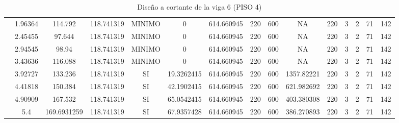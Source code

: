 \begin{table}[H]
{\begin{tabular}{|c|c|c|c|c|c|c|c|c|c|c|c|c|c|c|}
\cline{2-15}    & 1.96364 & 114.792 & 118.741319 & MINIMO & 0   & 614.660945 & 220 & 600 & NA  & 220 & 3   & 2   & 71  & 142 \bigstrut\\
\cline{2-15}    & 2.45455 & 97.644 & 118.741319 & MINIMO & 0   & 614.660945 & 220 & 600 & NA  & 220 & 3   & 2   & 71  & 142 \bigstrut\\
\cline{2-15}    & 2.94545 & 98.94 & 118.741319 & MINIMO & 0   & 614.660945 & 220 & 600 & NA  & 220 & 3   & 2   & 71  & 142 \bigstrut\\
\cline{2-15}    & 3.43636 & 116.088 & 118.741319 & MINIMO & 0   & 614.660945 & 220 & 600 & NA  & 220 & 3   & 2   & 71  & 142 \bigstrut\\
\cline{2-15}    & 3.92727 & 133.236 & 118.741319 & SI  & 19.3262415 & 614.660945 & 220 & 600 & 1357.82221 & 220 & 3   & 2   & 71  & 142 \bigstrut\\
\cline{2-15}    & 4.41818 & 150.384 & 118.741319 & SI  & 42.1902415 & 614.660945 & 220 & 600 & 621.982692 & 220 & 3   & 2   & 71  & 142 \bigstrut\\
\cline{2-15}    & 4.90909 & 167.532 & 118.741319 & SI  & 65.0542415 & 614.660945 & 220 & 600 & 403.380308 & 220 & 3   & 2   & 71  & 142 \bigstrut\\
\cline{2-15}    & 5.4 & 169.6931259 & 118.741319 & SI  & 67.9357428 & 614.660945 & 220 & 600 & 386.270893 & 220 & 3   & 2   & 71  & 142 \bigstrut\\
\hline
\end{tabular}%

  
 
  }%
    \caption{Diseño a cortante de la viga 6 (PISO 4) }
  \label{tab:C VG6 P4 }%
\end{table}%

